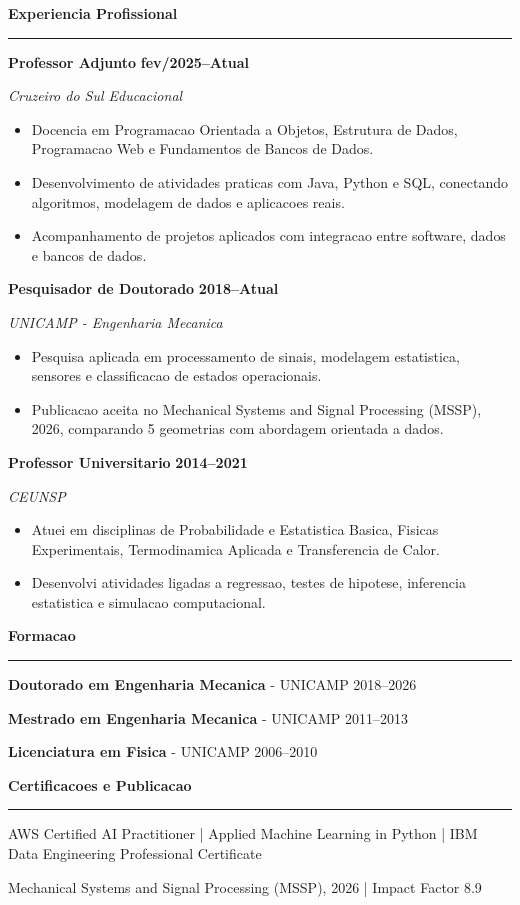 \documentclass[10pt,a4paper]{article}
\newcommand{\cvsection}[1]{%
    \vspace{0.38em}
    {\large\bfseries #1}\par
    \vspace{0.08em}
    \hrule
    \vspace{0.18em}
}
\newcommand{\entry}[4]{%
    \textbf{#1} \hfill \textbf{#2}\par
    \textit{#3}\par
    #4
    \vspace{0.14em}
}
\begin{document}
\cvsection{Experiencia Profissional}
\entry{Professor Adjunto}{fev/2025--Atual}{Cruzeiro do Sul Educacional}{
\begin{itemize}
    \item Docencia em Programacao Orientada a Objetos, Estrutura de Dados, Programacao Web e Fundamentos de Bancos de Dados.
    \item Desenvolvimento de atividades praticas com Java, Python e SQL, conectando algoritmos, modelagem de dados e aplicacoes reais.
    \item Acompanhamento de projetos aplicados com integracao entre software, dados e bancos de dados.
\end{itemize}
}

\entry{Pesquisador de Doutorado}{2018--Atual}{UNICAMP - Engenharia Mecanica}{
\begin{itemize}
    \item Pesquisa aplicada em processamento de sinais, modelagem estatistica, sensores e classificacao de estados operacionais.
    \item Publicacao aceita no Mechanical Systems and Signal Processing (MSSP), 2026, comparando 5 geometrias com abordagem orientada a dados.
\end{itemize}
}

\entry{Professor Universitario}{2014--2021}{CEUNSP}{
\begin{itemize}
    \item Atuei em disciplinas de Probabilidade e Estatistica Basica, Fisicas Experimentais, Termodinamica Aplicada e Transferencia de Calor.
    \item Desenvolvi atividades ligadas a regressao, testes de hipotese, inferencia estatistica e simulacao computacional.
\end{itemize}
}

\cvsection{Formacao}
\textbf{Doutorado em Engenharia Mecanica} - UNICAMP \hfill 2018--2026\par
\textbf{Mestrado em Engenharia Mecanica} - UNICAMP \hfill 2011--2013\par
\textbf{Licenciatura em Fisica} - UNICAMP \hfill 2006--2010

\cvsection{Certificacoes e Publicacao}
AWS Certified AI Practitioner | Applied Machine Learning in Python | IBM Data Engineering Professional Certificate\par
Mechanical Systems and Signal Processing (MSSP), 2026 | Impact Factor 8.9
\end{document}

